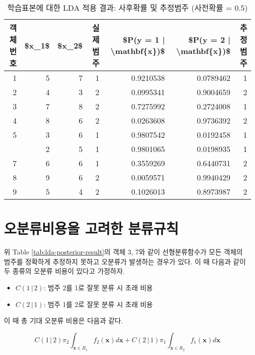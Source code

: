 \documentclass[]{book}
\providecommand{\tightlist}{%
  \setlength{\itemsep}{0pt}\setlength{\parskip}{0pt}}
\begin{document}
\begin{table}[t]

\caption{\label{tab:lda-posterior-result-equal-prior}학습표본에 대한 LDA 적용 결과: 사후확률 및 추정범주 (사전확률 = 0.5)}
\centering
\begin{tabular}{rrrrrrr}
\toprule
객체번호 & \$x\_1\$ & \$x\_2\$ & 실제범주 & \$P(y = 1 | \textbackslash{}mathbf\{x\})\$ & \$P(y = 2 | \textbackslash{}mathbf\{x\})\$ & 추정범주\\
\midrule
1 & 5 & 7 & 1 & 0.9210538 & 0.0789462 & 1\\
2 & 4 & 3 & 2 & 0.0995341 & 0.9004659 & 2\\
3 & 7 & 8 & 2 & 0.7275992 & 0.2724008 & 1\\
4 & 8 & 6 & 2 & 0.0263608 & 0.9736392 & 2\\
5 & 3 & 6 & 1 & 0.9807542 & 0.0192458 & 1\\
\addlinespace
6 & 2 & 5 & 1 & 0.9801065 & 0.0198935 & 1\\
7 & 6 & 6 & 1 & 0.3559269 & 0.6440731 & 2\\
8 & 9 & 6 & 2 & 0.0059571 & 0.9940429 & 2\\
9 & 5 & 4 & 2 & 0.1026013 & 0.8973987 & 2\\
\bottomrule
\end{tabular}
\end{table}

\hypertarget{lda-misclassification-cost}{%
\section{오분류비용을 고려한 분류규칙}\label{lda-misclassification-cost}}

위 Table \ref{tab:lda-posterior-result}의 객체 3, 7와 같이 선형분류함수가 모든 객체의 범주를 정확하게 추정하지 못하고 오분류가 발생하는 경우가 있다. 이 때 다음과 같이 두 종류의 오분류 비용이 있다고 가정하자.

\begin{itemize}
\tightlist
\item
  \(C(1 \, | \, 2)\): 범주 2를 1로 잘못 분류 시 초래 비용
\item
  \(C(2 \, | \, 1)\): 범주 1를 2로 잘못 분류 시 초래 비용
\end{itemize}

이 때 총 기대 오분류 비용은 다음과 같다.

\begin{equation}
C(1 \, | \, 2) \pi_2 \int_{\mathbf{x} \in R_1} f_2(\mathbf{x}) d\mathbf{x} + C(2 \, | \, 1) \pi_1 \int_{\mathbf{x} \in R_2} f_1(\mathbf{x}) d\mathbf{x}
\label{eq:expected-misclassification-cost}
\end{equation}
\end{document}
